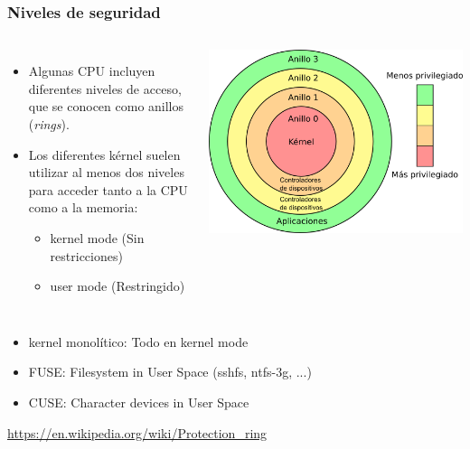 \documentclass{beamer}
\begin{document}
\begin{frame} \frametitle{Niveles de seguridad}
  \begin{columns}
    \begin{itemize}
    \item Algunas CPU incluyen diferentes niveles de acceso, que se
      conocen como anillos (\emph{rings}).
    \item Los diferentes kérnel suelen utilizar al menos dos niveles
      para acceder tanto a la CPU como a la memoria:
      \begin{itemize}
      \item kernel mode (Sin restricciones)
      \item user mode (Restringido)
      \end{itemize}
    \end{itemize}
    \begin{center}
      \includegraphics[width=\columnwidth]{img/Priv_rings.png}
    \end{center}
  \end{columns}
    \begin{itemize}
    \item kernel monolítico: Todo en kernel mode
    \item FUSE: Filesystem in User Space (sshfs, ntfs-3g, ...)
    \item CUSE: Character devices in User Space
    \end{itemize}
    \footnotesize{\url{https://en.wikipedia.org/wiki/Protection_ring}}
\end{frame}
\end{document}
